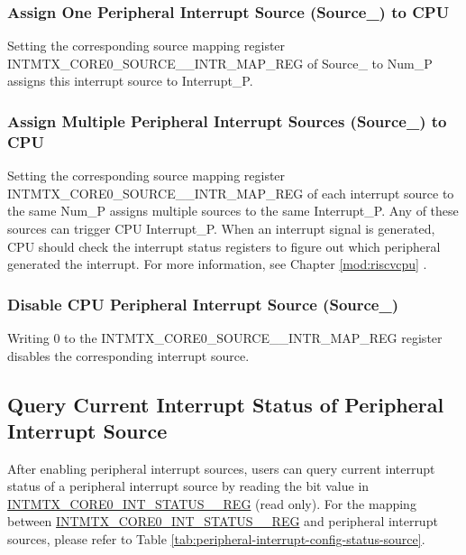 \documentclass[main\_\_EN.tex]{subfiles}
\begin{document}
\subsubsection{Assign One Peripheral Interrupt Source (Source\_) to CPU}
Setting the corresponding source mapping  register INTMTX\_CORE0\_SOURCE\_\_INTR\_MAP\_REG of Source\_ to Num\_P assigns this interrupt source to Interrupt\_P. 

\subsubsection{Assign Multiple Peripheral Interrupt Sources (Source\_) to CPU}
Setting the corresponding source mapping register INTMTX\_CORE0\_SOURCE\_\_INTR\_MAP\_REG of each interrupt source to the same Num\_P assigns multiple sources to the same Interrupt\_P. Any of these sources can trigger CPU Interrupt\_P. When an interrupt signal is generated, CPU should check the interrupt status registers to figure out which peripheral generated the interrupt. For more information, see Chapter \ref{mod:riscvcpu} \textit{}.

\subsubsection{Disable CPU Peripheral Interrupt Source (Source\_)}
Writing 0 to the INTMTX\_CORE0\_SOURCE\_\_INTR\_MAP\_REG register disables the corresponding interrupt source.

\subsection{Query Current Interrupt Status of Peripheral Interrupt Source}

After enabling peripheral interrupt sources, users can query current interrupt status of a peripheral interrupt source by reading the bit value in \hyperref[regdesc:INTMTXCORE0INTSTATUS0REG]{INTMTX\_CORE0\_INT\_STATUS\_\_REG} (read only). For the mapping between \hyperref[regdesc:INTMTXCORE0INTSTATUS0REG]{INTMTX\_CORE0\_INT\_STATUS\_\_REG} and peripheral interrupt sources, please refer to Table \ref{tab:peripheral-interrupt-config-status-source}.



\end{document}
